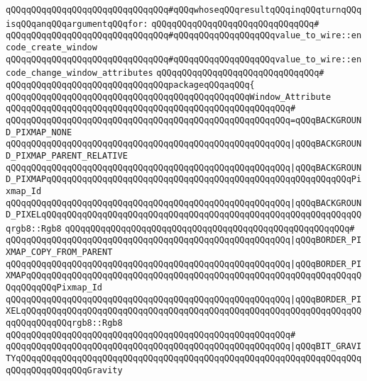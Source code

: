 \verb|qQQqqQQqqQQqqQQqqQQqqQQqqQQqqQQq#qQQqwhoseqQQqresultqQQqinqQQqturnqQQqisqQQqanqQQqargumentqQQqfor:|\newline
\verb|qQQqqQQqqQQqqQQqqQQqqQQqqQQqqQQq#|\newline
\verb|qQQqqQQqqQQqqQQqqQQqqQQqqQQqqQQq#qQQqqQQqqQQqqQQqqQQqvalue_to_wire::encode_create_window|\newline
\verb|qQQqqQQqqQQqqQQqqQQqqQQqqQQqqQQq#qQQqqQQqqQQqqQQqqQQqvalue_to_wire::encode_change_window_attributes|\newline
\verb|qQQqqQQqqQQqqQQqqQQqqQQqqQQqqQQq#|\newline
\verb|qQQqqQQqqQQqqQQqqQQqqQQqqQQqqQQqpackageqQQqaqQQq{|\newline
\newline
\verb|qQQqqQQqqQQqqQQqqQQqqQQqqQQqqQQqqQQqqQQqqQQqqQQqWindow_Attribute|\newline
\verb|qQQqqQQqqQQqqQQqqQQqqQQqqQQqqQQqqQQqqQQqqQQqqQQqqQQqqQQq#|\newline
\verb|qQQqqQQqqQQqqQQqqQQqqQQqqQQqqQQqqQQqqQQqqQQqqQQqqQQqqQQq=qQQqBACKGROUND_PIXMAP_NONE|\newline
\verb|qQQqqQQqqQQqqQQqqQQqqQQqqQQqqQQqqQQqqQQqqQQqqQQqqQQqqQQq|\verb#|qQQqBACKGROUND_PIXMAP_PARENT_RELATIVE#\newline
\verb|qQQqqQQqqQQqqQQqqQQqqQQqqQQqqQQqqQQqqQQqqQQqqQQqqQQqqQQq|\verb#|qQQqBACKGROUND_PIXMAPqQQqqQQqqQQqqQQqqQQqqQQqqQQqqQQqqQQqqQQqqQQqqQQqqQQqqQQqqQQqPixmap_Id#\newline
\verb|qQQqqQQqqQQqqQQqqQQqqQQqqQQqqQQqqQQqqQQqqQQqqQQqqQQqqQQq|\verb#|qQQqBACKGROUND_PIXELqQQqqQQqqQQqqQQqqQQqqQQqqQQqqQQqqQQqqQQqqQQqqQQqqQQqqQQqqQQqqQQqrgb8::Rgb8#\newline
\verb|qQQqqQQqqQQqqQQqqQQqqQQqqQQqqQQqqQQqqQQqqQQqqQQqqQQqqQQq#|\newline
\verb|qQQqqQQqqQQqqQQqqQQqqQQqqQQqqQQqqQQqqQQqqQQqqQQqqQQqqQQq|\verb#|qQQqBORDER_PIXMAP_COPY_FROM_PARENT#\newline
\verb|qQQqqQQqqQQqqQQqqQQqqQQqqQQqqQQqqQQqqQQqqQQqqQQqqQQqqQQq|\verb#|qQQqBORDER_PIXMAPqQQqqQQqqQQqqQQqqQQqqQQqqQQqqQQqqQQqqQQqqQQqqQQqqQQqqQQqqQQqqQQqqQQqqQQqqQQqPixmap_Id#\newline
\verb|qQQqqQQqqQQqqQQqqQQqqQQqqQQqqQQqqQQqqQQqqQQqqQQqqQQqqQQq|\verb#|qQQqBORDER_PIXELqQQqqQQqqQQqqQQqqQQqqQQqqQQqqQQqqQQqqQQqqQQqqQQqqQQqqQQqqQQqqQQqqQQqqQQqqQQqqQQqrgb8::Rgb8#\newline
\verb|qQQqqQQqqQQqqQQqqQQqqQQqqQQqqQQqqQQqqQQqqQQqqQQqqQQqqQQq#|\newline
\verb|qQQqqQQqqQQqqQQqqQQqqQQqqQQqqQQqqQQqqQQqqQQqqQQqqQQqqQQq|\verb#|qQQqBIT_GRAVITYqQQqqQQqqQQqqQQqqQQqqQQqqQQqqQQqqQQqqQQqqQQqqQQqqQQqqQQqqQQqqQQqqQQqqQQqqQQqqQQqqQQqGravity#\newline
